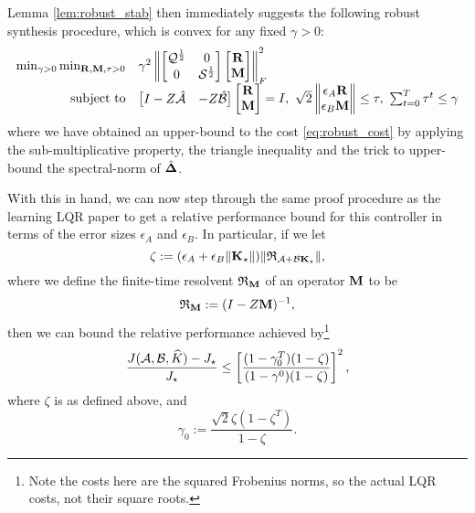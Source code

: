 \documentclass[11pt]{article}
\numberwithin{equation}{section}
\begin{document}
Lemma \ref{lem:robust_stab} then immediately suggests the following robust synthesis procedure, which is convex for any fixed $\gamma>0$:
\begin{equation}
\begin{array}{rl}
\min_{\gamma>0}  \min_{\tf R, \tf M,\tau>0} &\gamma^2 \bignorm{\begin{bmatrix} \Qq^{\frac{1}{2}} & 0 \\ 0 & \Ss^{\frac{1}{2}}\end{bmatrix}\begin{bmatrix}\tf R \\ \tf M\end{bmatrix}}_F^2 \\
\st & \begin{bmatrix} I - Z\Ahh & -Z\Bhh \end{bmatrix}\begin{bmatrix} \tf R \\ \tf M \end{bmatrix} = I, \ \sqrt{2}\bignorm{\begin{matrix} \epsilon_A\tf R \\ \epsilon_B\tf M\end{matrix}} \leq \tau, \ \sum_{t=0}^T \tau^t \leq \gamma
\end{array}
\end{equation}
where we have obtained an upper-bound to the cost \eqref{eq:robust_cost} by applying the sub-multiplicative property, the triangle inequality and the trick to upper-bound the spectral-norm of $\hat{\mathbf{\Delta}}$.

With this in hand, we can now step through the same proof procedure as the learning LQR paper to get a relative performance bound for this controller in terms of the error sizes $\epsilon_A$ and $\epsilon_B$.  In particular, if we let
\begin{equation}
\zeta := (\epsilon_A + \epsilon_B \|\mathbf{K}_\star\|)\|\mathfrak{R}_{\mathcal{A} + \mathcal{B}\mathbf{K}_\star}\|,
\end{equation}
where we define the finite-time resolvent $\mathfrak{R}_{\mathbf{M}}$ of an operator $\mathbf{M}$ to be
\begin{equation}
\mathfrak{R}_{\mathbf{M}} := (I - Z\mathbf{M})^{-1},
\end{equation}
then we can bound the relative performance achieved by\footnote{Note the costs here are the squared Frobenius norms, so the actual LQR costs, not their square roots.}
\begin{equation}
\frac{J(\mathcal{A},\mathcal{B},\widehat{K}) - J_\star}{J_\star} \leq \left[\frac{(1-\gamma_0^T)(1-\zeta)}{(1-\gamma^0)(1-\zeta)}\right]^2,
\end{equation}
where $\zeta$ is as defined above, and 
\begin{equation}
\gamma_0 := \frac{\sqrt{2}\zeta(1-\zeta^T)}{1-\zeta}.
\end{equation}
\end{document}
